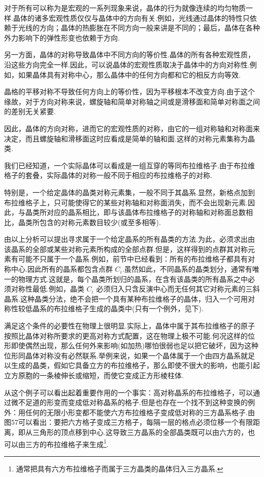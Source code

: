 对于所有可以称为是宏观的一系列现象来说，晶体的行为就像连续的均匀物质一样.晶体的诸多宏观性质仅仅与晶体中的方向有关.例如，光线通过晶体的特性只依赖于光线的方向；晶体的热膨胀在不同方向一般来讲是不同的；最后，晶体在各种外力影响下的弹性形变也依赖于方向.

另一方面，晶体的对称导致晶体中不同方向的等价性.晶体的所有各种宏观性质，沿这些方向完全一样.因此，可以说晶体的宏观性质取决于晶体中的方向对称性.例如，如果晶体具有对称中心，那么晶体中的任何方向都和它的相反方向等效.

晶格的平移对称不导致任何方向上的等价性，因为平移根本不改变方向.由于这个缘故，对于方向对称来说，螺旋轴和简单对称轴之间或是滑移面和简单对称面之间的差别无关紧要.

因此，晶体的方向对称，进而它的宏观性质的对称，由它的一组对称轴和对称面来决定，而且螺旋轴和滑移面这时应看成是简单的轴和面.这样的对称元素集称为晶类.

我们已经知道，一个实际晶体可以看成是一组互穿的等同布拉维格子.由于布拉维格子的套叠，实际晶体的对称一般不同于相应的布拉维格子的对称.

特别是，一个给定晶体的晶类对称元素集，一般不同于其晶系.显然，新格点加到布拉维格子上，只可能使得它的某些对称轴和对称面消失，而不会出现新元素.因此，与晶类所对应的晶系相比，即与该晶体布拉维格子的对称轴和对称面总数相比，晶类所包含的对称元素数目较少(或至多相等).

由以上分析可以提出寻求属于一个给定晶系的所有晶类的方法.为此，必须求出由该晶系的全部或某些对称元素所构成的全部点群.但是，这样得到的点群其对称元素有可能不只属于一个晶系.例如，前节中已经看到：所有的布拉维格子都具有对称中心.因此所有的晶系都包含点群 $C_i$.虽然如此，不同晶系的晶类划分，通常有唯一的物理方式.这就是，每个晶类所划归的晶系，在含有该晶类的所有晶系之中必须对称性最低.例如，晶类 $C_i$ 必须归入只含反演中心而无任何其它对称元素的三斜晶系.这种晶类分法，绝不会把一个具有某种布拉维格子的晶体，归入一个可用对称性较低晶系的布拉维格子生成的晶类中(只有一个例外，见下).

满足这个条件的必要性在物理上很明显.实际上，晶体中属于其布拉维格子的原子按照比晶体对称所要求的更高对称方式配置，这在物理上极不可能.何况这样的位形即使偶然出现，那么任何外来影响(如加热)哪怕很弱也足以把它破坏，因为这种位形同晶体对称没有必然联系.举例来说，如果一个晶体属于一个由四方晶系就足以生成的晶类，假如它具备立方的布拉维格子，那么即使不很大的影响，也能引起立方原胞的一条棱伸长或缩短，而使它变成正方形棱柱体.

从这个例子可以看出起着重要作用的一个事实：高对称晶系的布拉维格子，可以通过微不足道的形变而变成低对称晶系的格子.但是也存在一个找不到这种变换的例外：用任何的无限小形变都不能使六方布拉维格子变成低对称的三方晶系格子.由图57可以看出：要把六方格子变成三方格子，每隔一层的格点必须位移一个有限距离，即从三角形的顶点移到中心.这导致三方晶系的全部晶类既可以由六方的，也可以由三方的布拉维格子来生成\footnote{通常把具有六方布拉维格子而属于三方晶类的晶体归入三方晶系.}.

